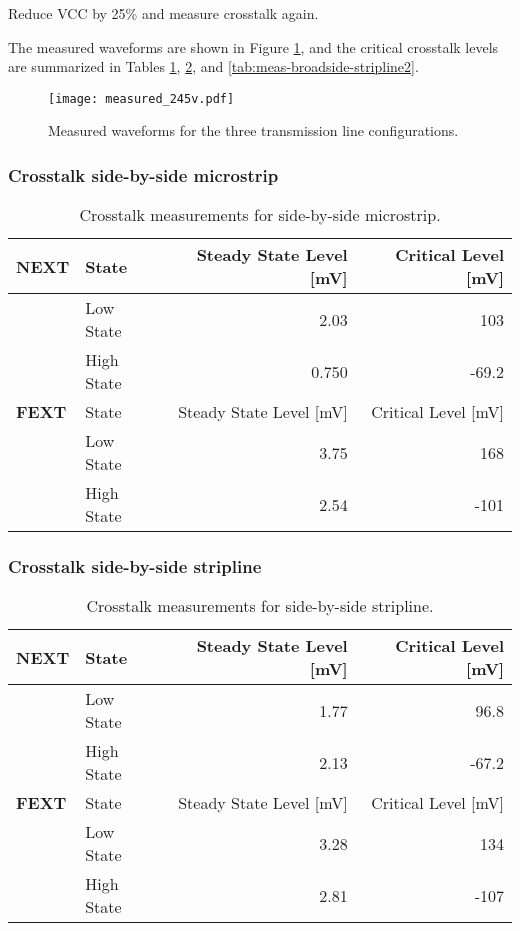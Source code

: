 \documentclass[../main.tex]{subfiles}
\begin{document}
Reduce VCC by 25\% and measure crosstalk again.

\solution

The measured waveforms are shown in Figure \ref{fig:meas-waveforms2}, and the critical crosstalk levels are summarized in Tables \ref{tab:meas-side-by-side-microstrip2}, \ref{tab:meas-side-by-side-stripline2}, and \ref{tab:meas-broadside-stripline2}.

\begin{figure}[h]
    \centering
    \texttt{[image: measured\_245v.pdf]}
    \caption{Measured waveforms for the three transmission line configurations.}
    \label{fig:meas-waveforms2}
\end{figure}

\subsubsection{Crosstalk side-by-side microstrip}

\begin{table}[h]
    \centering
    \begin{tabular}{l l|r r}
        \toprule[1pt]
        \textbf{NEXT} & State & Steady State Level [mV] & Critical Level [mV] \\
        \midrule
        & Low State & 2.03 & 103 \\
        & High State & 0.750 & -69.2 \\
        \midrule[1pt]
        \textbf{FEXT} & State & Steady State Level [mV] & Critical Level [mV] \\
        \midrule
        & Low State & 3.75 & 168 \\
        & High State & 2.54 & -101 \\
        \bottomrule[1pt]
    \end{tabular}
    \caption{Crosstalk measurements for side-by-side microstrip.}
    \label{tab:meas-side-by-side-microstrip2}
\end{table}

\subsubsection{Crosstalk side-by-side stripline}

\begin{table}[h]
    \centering
    \begin{tabular}{l l|r r}
        \toprule[1pt]
        \textbf{NEXT} & State & Steady State Level [mV] & Critical Level [mV] \\
        \midrule
        & Low State & 1.77 & 96.8 \\
        & High State & 2.13 & -67.2 \\
        \midrule[1pt]
        \textbf{FEXT} & State & Steady State Level [mV] & Critical Level [mV] \\
        \midrule
        & Low State & 3.28 & 134 \\
        & High State & 2.81 & -107 \\
        \bottomrule[1pt]
    \end{tabular}
    \caption{Crosstalk measurements for side-by-side stripline.}
    \label{tab:meas-side-by-side-stripline2}
\end{table}
\end{document}
